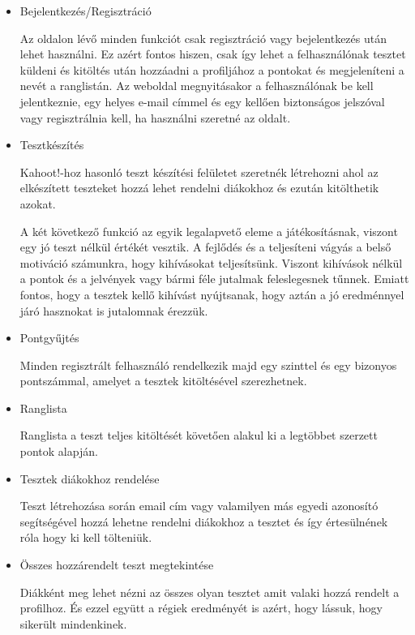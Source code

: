 \begin{itemize}
    \item {Bejelentkezés/Regisztráció}
          \begin{addmargin}[\parindent]{0pt}
              Az oldalon lévő minden funkciót csak regisztráció vagy bejelentkezés után lehet használni. Ez azért fontos hiszen, csak így lehet a felhasználónak tesztet küldeni és kitöltés után hozzáadni a profiljához a pontokat és megjeleníteni a nevét a ranglistán. Az weboldal megnyitásakor a felhasználónak be kell jelentkeznie, egy helyes e-mail címmel és egy kellően biztonságos jelszóval vagy regisztrálnia kell, ha használni szeretné az oldalt.
          \end{addmargin}
    \item {Tesztkészítés}
          \begin{addmargin}[\parindent]{0pt}
              Kahoot!-hoz hasonló teszt készítési felületet szeretnék létrehozni ahol az elkészített teszteket hozzá lehet rendelni diákokhoz és ezután kitölthetik azokat.

              A két következő funkció az egyik legalapvető eleme a játékosításnak, viszont egy jó teszt nélkül értékét vesztik. A fejlődés és a teljesíteni vágyás a belső motiváció számunkra, hogy kihívásokat teljesítsünk. Viszont kihívások nélkül a pontok és a jelvények vagy bármi féle jutalmak feleslegesnek tűnnek. Emiatt fontos, hogy a tesztek kellő kihívást nyújtsanak, hogy aztán a jó eredménnyel járó hasznokat is jutalomnak érezzük.
          \end{addmargin}
    \item {Pontgyűjtés}
          \begin{addmargin}[\parindent]{0pt}
              Minden regisztrált felhasználó rendelkezik majd egy szinttel és egy bizonyos pontszámmal, amelyet a tesztek kitöltésével szerezhetnek.
          \end{addmargin}
    \item {Ranglista}
          \begin{addmargin}[\parindent]{0pt}
              Ranglista a teszt teljes kitöltését követően alakul ki a legtöbbet szerzett pontok alapján.
          \end{addmargin}
    \item {Tesztek diákokhoz rendelése}
          \begin{addmargin}[\parindent]{0pt}
              Teszt létrehozása során email cím vagy valamilyen más egyedi azonosító segítségével hozzá lehetne rendelni diákokhoz a tesztet és így értesülnének róla hogy ki kell tölteniük.
          \end{addmargin}
    \item {Összes hozzárendelt teszt megtekintése}
          \begin{addmargin}[\parindent]{0pt}
              Diákként meg lehet nézni az összes olyan tesztet amit valaki hozzá rendelt a profilhoz. És ezzel együtt a régiek eredményét is azért, hogy lássuk, hogy sikerült mindenkinek.
          \end{addmargin}
\end{itemize}

